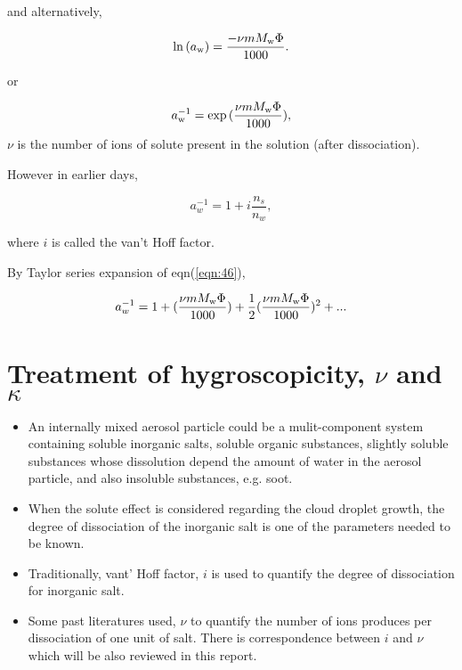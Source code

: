 \documentclass[12pt]{article}
\begin{document}
{and alternatively, 

\begin{equation}
\ln {(a_{\rm w})}=\frac{- \nu m M_{\rm w} \Phi }{1000}.
\end{equation}

or 

\begin{equation}\label{eqn:46}
a_{\rm w}^{-1}=\exp{(\frac{\nu m M_{\rm w} \Phi }{1000})},
\end{equation}
$\nu$ is the number of ions of solute present in the solution (after dissociation). 

However in earlier days, 

\begin{equation}
a_{w}^{-1}=1+i \frac{n_{s}}{n_{w}},
\end{equation}

where $i$ is called the van't Hoff factor.

By Taylor series expansion of eqn(\ref{eqn:46}), 

\begin{equation}
a_{w}^{-1}=1+(\frac{\nu m M_{\rm w} \Phi }{1000})+\frac{1}{2}(\frac{\nu m M_{\rm w} \Phi }{1000})^{2}+...
\end{equation}


\section{Treatment of hygroscopicity, $\nu$ and $\kappa$}  
 
\begin{itemize}

\item An internally mixed aerosol particle could be a mulit-component system containing soluble inorganic salts, soluble organic substances, slightly soluble substances whose dissolution depend the amount of water in the aerosol particle, and also insoluble substances, e.g. soot.

\item When the solute effect is considered regarding the cloud droplet growth, the degree of dissociation of the inorganic salt is one of the parameters needed to be known. 

\item Traditionally, vant' Hoff factor, $i$ is used to quantify the degree of dissociation for inorganic salt. 

\item Some past literatures used, $\nu$ to quantify the number of ions produces per dissociation of one unit of salt. There is correspondence between $i$ and $\nu$ which will be also reviewed in this report.


\end{itemize}}
\end{document}
